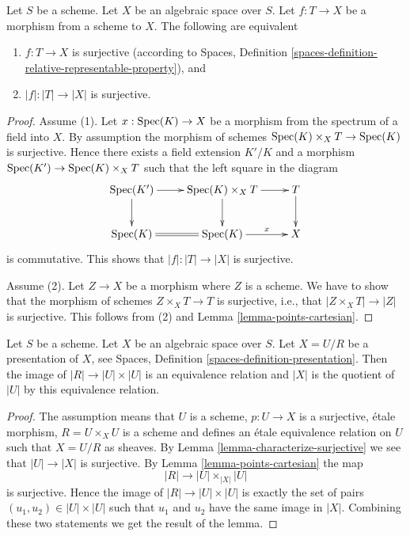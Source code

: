 \begin{lemma}
\label{lemma-characterize-surjective}
Let $S$ be a scheme.
Let $X$ be an algebraic space over $S$.
Let $f : T \to X$ be a morphism from a scheme to $X$.
The following are equivalent
\begin{enumerate}
\item $f : T \to X$ is surjective (according to
Spaces, Definition \ref{spaces-definition-relative-representable-property}),
and
\item $|f| : |T| \to |X|$ is surjective.
\end{enumerate}
\end{lemma}

\begin{proof}
Assume (1). Let $x : \mathop{\mathrm{Spec}}(K) \to X$ be a morphism
from the spectrum of a field into $X$. By assumption the morphism of
schemes $\mathop{\mathrm{Spec}}(K) \times_X T \to \mathop{\mathrm{Spec}}(K)$ is surjective.
Hence there exists a field extension $K'/K$ and a morphism
$\mathop{\mathrm{Spec}}(K') \to \mathop{\mathrm{Spec}}(K) \times_X T$ such that the left
square in the diagram
$$
\xymatrix{
\Spec(K') \ar[r] \ar[d] &
\Spec(K) \times_X T \ar[d] \ar[r] &
T \ar[d] \\
\Spec(K) \ar@{=}[r] &
\Spec(K) \ar[r]^-x & X
}
$$
is commutative. This shows that $|f| : |T| \to |X|$ is surjective.

\medskip\noindent
Assume (2). Let $Z \to X$ be a morphism where $Z$ is
a scheme. We have to show that the morphism of schemes $Z \times_X T \to T$
is surjective, i.e., that $|Z \times_X T| \to |Z|$ is surjective.
This follows from (2) and
Lemma \ref{lemma-points-cartesian}.
\end{proof}

\begin{lemma}
\label{lemma-points-presentation}
Let $S$ be a scheme.
Let $X$ be an algebraic space over $S$.
Let $X = U/R$ be a presentation of $X$, see
Spaces, Definition \ref{spaces-definition-presentation}.
Then the image of $|R| \to |U| \times |U|$ is an equivalence relation
and $|X|$ is the quotient of $|U|$ by this equivalence relation.
\end{lemma}

\begin{proof}
The assumption means that $U$ is a scheme, $p : U \to X$ is a surjective,
\'etale morphism, $R = U \times_X U$ is a scheme and defines an \'etale
equivalence relation on $U$ such that $X = U/R$ as sheaves. By
Lemma \ref{lemma-characterize-surjective}
we see that $|U| \to |X|$ is surjective. By
Lemma \ref{lemma-points-cartesian}
the map
$$
|R| \longrightarrow |U| \times_{|X|} |U|
$$
is surjective. Hence the image of $|R| \to |U| \times |U|$ is
exactly the set of pairs $(u_1, u_2) \in |U| \times |U|$
such that $u_1$ and $u_2$ have the same image in $|X|$.
Combining these two statements we get the result of the lemma.
\end{proof}

